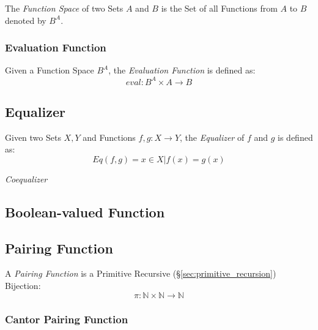 The \emph{Function Space} of two Sets $A$ and $B$ is the Set of all
Functions from $A$ to $B$ denoted by $B^A$.



\subsubsection{Evaluation Function}\label{sec:evaluation_function}

Given a Function Space $B^A$, the \emph{Evaluation Function} is
defined as:
\[
  eval : B^A \times A \rightarrow B
\]



\subsection{Equalizer}\label{sec:equalizer}

Given two Sets $X,Y$ and Functions $f,g : X \rightarrow Y$, the
\emph{Equalizer} of $f$ and $g$ is defined as:
\[
  Eq(f,g) = { x \in X | f(x) = g(x) }
\]

\emph{Coequalizer}



\subsection{Boolean-valued Function}\label{sec:boolean_function}

\subsection{Pairing Function}\label{sec:pairing_function}

A \emph{Pairing Function} is a Primitive Recursive
(\S\ref{sec:primitive_recursion}) Bijection:
\[
  \pi : \mathbb{N} \times \mathbb{N} \rightarrow \mathbb{N}
\]



\subsubsection{Cantor Pairing Function}\label{sec:cantor_pairing}



